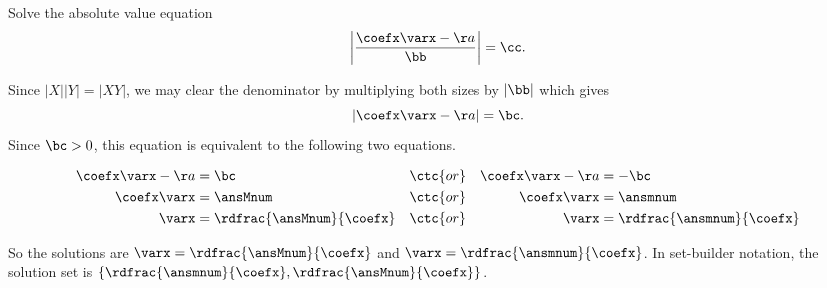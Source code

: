 


\edef\varx{\varx}





\pgfmathtruncatemacro{\bc}{\bb*\cc}
\pgfmathtruncatemacro{\ansMnum}{\aa+\bb*\cc}
\pgfmathtruncatemacro{\ansmnum}{\aa-\bb*\cc}



Solve the absolute value equation 
\[\left|\frac{\coefx \varx - \aa}{\bb}\right| = \cc.\]

\begin{solution}
Since $|X||Y|=|XY|$, we may clear the denominator by multiplying both sizes by $|\bb|$ which gives
\[|\coefx \varx - \aa| = \bc.\]
Since $\bc>0$, this equation is equivalent to the following two equations.

\begin{center}
	\begin{alignat*}{3}
		\coefx \varx - \aa&=\bc &&\ctc{ or } & \coefx \varx - \aa&=-\bc\\
		\coefx \varx&=\ansMnum && \ctc{or} & \coefx \varx&=\ansmnum\\
		\varx&=\rdfrac{\ansMnum}{\coefx} && \ctc{or} & \varx&=\rdfrac{\ansmnum}{\coefx}\\
	\end{alignat*}
\end{center} 
So the solutions are $\varx=\rdfrac{\ansMnum}{\coefx}$ and $\varx=\rdfrac{\ansmnum}{\coefx}$. In set-builder notation, the solution set is 
$\{\rdfrac{\ansmnum}{\coefx}, \rdfrac{\ansMnum}{\coefx}\}$.
\end{solution}

